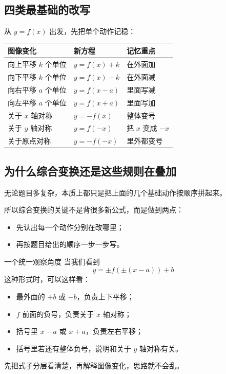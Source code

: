 \documentclass[11pt,a4paper,fontset=fandol]{ctexart}
\theoremstyle{formaltheorem}
\theoremstyle{formalexample}
\begin{document}
\subsection{四类最基础的改写}
从 \(y=f(x)\) 出发，先把单个动作记稳：
\begin{center}
\renewcommand{\arraystretch}{1.45}
\begin{tabular}{|m{3.4cm}|m{4.2cm}|m{5.1cm}|}
\hline
图像变化 & 新方程 & 记忆重点 \\
\hline
向上平移 \(k\) 个单位 & \(y=f(x)+k\) & 在外面加 \\
\hline
向下平移 \(k\) 个单位 & \(y=f(x)-k\) & 在外面减 \\
\hline
向右平移 \(a\) 个单位 & \(y=f(x-a)\) & 里面写减 \\
\hline
向左平移 \(a\) 个单位 & \(y=f(x+a)\) & 里面写加 \\
\hline
关于 \(x\) 轴对称 & \(y=-f(x)\) & 整体变号 \\
\hline
关于 \(y\) 轴对称 & \(y=f(-x)\) & 把 \(x\) 变成 \(-x\) \\
\hline
关于原点对称 & \(y=-f(-x)\) & 里外都变号 \\
\hline
\end{tabular}
\end{center}

\subsection{为什么综合变换还是这些规则在叠加}
无论题目多复杂，本质上都只是把上面的几个基础动作按顺序拼起来。

所以综合变换的关键不是背很多新公式，而是做到两点：
\begin{itemize}
  \item 先认出每一个动作分别在改哪里；
  \item 再按题目给出的顺序一步一步写。
\end{itemize}

\begin{skillbox}{一个统一观察角度}
当我们看到
\[
y=\pm f(\pm(x-a))+b
\]
这种形式时，可以这样看：
\begin{itemize}
  \item 最外面的 \(+b\) 或 \(-b\)，负责上下平移；
  \item \(f\) 前面的负号，负责关于 \(x\) 轴对称；
  \item 括号里 \(x-a\) 或 \(x+a\)，负责左右平移；
  \item 括号里若还有整体负号，说明和关于 \(y\) 轴对称有关。
\end{itemize}
先把式子分层看清楚，再解释图像变化，思路就不会乱。
\end{skillbox}
\end{document}
